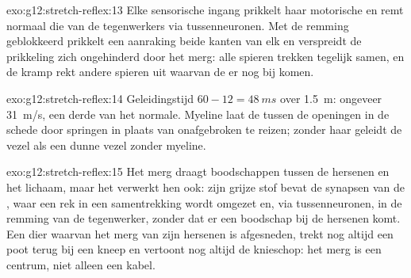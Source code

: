 \begin{solution}{exo:g12:stretch-reflex:13}
Elke sensorische ingang prikkelt haar motorische  en remt normaal
die van de tegenwerkers via tussenneuronen. Met de remming geblokkeerd
prikkelt een aanraking beide kanten van elk  en verspreidt de
prikkeling zich ongehinderd door het merg: alle spieren trekken tegelijk
samen, en de kramp rekt andere spieren uit waarvan de  er nog bij
komen.
\end{solution}

\begin{solution}{exo:g12:stretch-reflex:14}
Geleidingstijd $60 - 12 = \qty{48}{ms}$ over \qty{1.5}{m}: ongeveer
\qty{31}{m/s}, een derde van het normale. Myeline laat de 
tussen de openingen in de schede door springen in plaats van
onafgebroken te reizen; zonder haar geleidt de vezel als een dunne vezel
zonder myeline.
\end{solution}

\begin{solution}{exo:g12:stretch-reflex:15}
Het merg draagt boodschappen tussen de hersenen en het lichaam, maar het
verwerkt hen ook: zijn grijze stof bevat de synapsen van de ,
waar een rek in een samentrekking wordt omgezet en, via tussenneuronen, in
de remming van de tegenwerker, zonder dat er een boodschap bij de hersenen
komt. Een dier waarvan het merg van zijn hersenen is afgesneden, trekt nog
altijd een poot terug bij een kneep en vertoont nog altijd de knieschop:
het merg is een centrum, niet alleen een kabel.
\end{solution}

